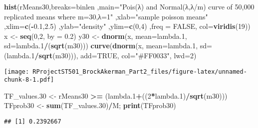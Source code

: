 \documentclass[
]{article}
\newenvironment{Shaded}{\begin{snugshade}}{\end{snugshade}}
\newcommand{\DataTypeTok}[1]{\textcolor[rgb]{0.13,0.29,0.53}{#1}}
\newcommand{\DecValTok}[1]{\textcolor[rgb]{0.00,0.00,0.81}{#1}}
\newcommand{\FloatTok}[1]{\textcolor[rgb]{0.00,0.00,0.81}{#1}}
\newcommand{\KeywordTok}[1]{\textcolor[rgb]{0.13,0.29,0.53}{\textbf{#1}}}
\newcommand{\NormalTok}[1]{#1}
\newcommand{\OperatorTok}[1]{\textcolor[rgb]{0.81,0.36,0.00}{\textbf{#1}}}
\newcommand{\OtherTok}[1]{\textcolor[rgb]{0.56,0.35,0.01}{#1}}
\newcommand{\StringTok}[1]{\textcolor[rgb]{0.31,0.60,0.02}{#1}}
\begin{document}
\begin{Shaded}
\begin{Highlighting}[]
\KeywordTok{hist}\NormalTok{(rMeans30,}\DataTypeTok{breaks=}\NormalTok{binlen ,}\DataTypeTok{main=}\StringTok{"Pois(λ) and Normal(λ,λ/m) curve of 50,000 replicated means where m=30,λ=1"}\NormalTok{ ,}\DataTypeTok{xlab=}\StringTok{"sample poisson means"}\NormalTok{ ,}\DataTypeTok{xlim=}\KeywordTok{c}\NormalTok{(}\OperatorTok{-}\FloatTok{0.1}\NormalTok{,}\FloatTok{2.5}\NormalTok{) ,}\DataTypeTok{ylab=}\StringTok{"density"}\NormalTok{ ,}\DataTypeTok{ylim=}\KeywordTok{c}\NormalTok{(}\DecValTok{0}\NormalTok{,}\DecValTok{4}\NormalTok{) ,}\DataTypeTok{freq =} \OtherTok{FALSE}\NormalTok{, }\DataTypeTok{col=}\KeywordTok{viridis}\NormalTok{(}\DecValTok{19}\NormalTok{))}
\NormalTok{x <-}\StringTok{ }\KeywordTok{seq}\NormalTok{(}\DecValTok{0}\NormalTok{,}\DecValTok{2}\NormalTok{, }\DataTypeTok{by =} \FloatTok{0.2}\NormalTok{)}
\NormalTok{y30 <-}\StringTok{ }\KeywordTok{dnorm}\NormalTok{(x, }\DataTypeTok{mean=}\NormalTok{lambda}\FloatTok{.1}\NormalTok{, }\DataTypeTok{sd=}\NormalTok{lambda}\FloatTok{.1}\OperatorTok{/}\NormalTok{(}\KeywordTok{sqrt}\NormalTok{(m30)))}
\KeywordTok{curve}\NormalTok{(}\KeywordTok{dnorm}\NormalTok{(x, }\DataTypeTok{mean=}\NormalTok{lambda}\FloatTok{.1}\NormalTok{, }\DataTypeTok{sd=}\NormalTok{(lambda}\FloatTok{.1}\OperatorTok{/}\KeywordTok{sqrt}\NormalTok{(m30))), }\DataTypeTok{add=}\OtherTok{TRUE}\NormalTok{, }\DataTypeTok{col=}\StringTok{"#FF0033"}\NormalTok{, }\DataTypeTok{lwd=}\DecValTok{2}\NormalTok{)}
\end{Highlighting}
\end{Shaded}

\texttt{[image: RProjectST501\_BrockAkerman\_Part2\_files/figure-latex/unnamed-chunk-8-1.pdf]}

\begin{Shaded}
\begin{Highlighting}[]
\NormalTok{TF_values}\FloatTok{.30}\NormalTok{ <-}\StringTok{ }\NormalTok{rMeans30 }\OperatorTok{>=}\StringTok{ }\NormalTok{(lambda}\FloatTok{.1}\OperatorTok{+}\NormalTok{((}\DecValTok{2}\OperatorTok{*}\NormalTok{lambda}\FloatTok{.1}\NormalTok{)}\OperatorTok{/}\KeywordTok{sqrt}\NormalTok{(m30)))}
\NormalTok{TFprob30 <-}\StringTok{ }\KeywordTok{sum}\NormalTok{(TF_values}\FloatTok{.30}\NormalTok{)}\OperatorTok{/}\NormalTok{M; }\KeywordTok{print}\NormalTok{(TFprob30)}
\end{Highlighting}
\end{Shaded}

\begin{verbatim}
## [1] 0.2392667
\end{verbatim}
\end{document}
